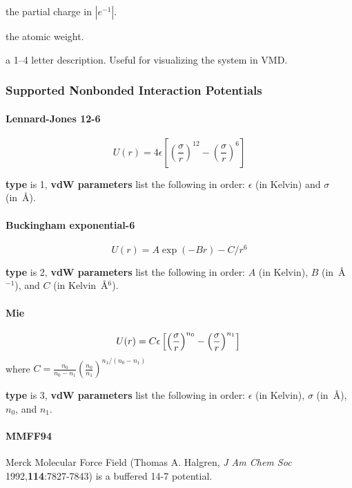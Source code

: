 \documentclass[12pt,letterpaper]{article}
\begin{document}
 the partial charge in $|e^{-1}|$.

 the atomic weight.

 a 1--4 letter description. Useful for
visualizing the system in VMD.

\subsubsection{Supported Nonbonded Interaction Potentials}
\label{vdW}
\paragraph{Lennard-Jones 12-6}

\begin{equation}
U(r) = 4 \epsilon \left[\left(\frac{\sigma}{r}\right)^{12}
-\left(\frac{\sigma}{r}\right)^6 \right]
\end{equation}

{\bf type} is 1, {\bf vdW parameters} list the following in
order: $\epsilon$ (in Kelvin) and $\sigma$ (in~\AA).

\paragraph{Buckingham exponential-6}
\begin{equation}
U(r) = A \exp(-Br) - C/r^6
\end{equation}

{\bf type} is 2, {\bf vdW parameters} list the following in
order: $A$ (in Kelvin), $B$ (in~\AA$^{-1}$), and $C$ (in
Kelvin~\AA$^6$).

\paragraph{Mie}
\begin{equation}
U(r) = C \epsilon \left[\left(\frac{\sigma}{r}\right)^{n_0}
-\left(\frac{\sigma}{r}\right)^{n_1} \right] \\
\end{equation}
where $C = \frac{n_0}{n_0-n_1} \left(\frac{n_0}{n_1}\right)^{n_1/(n_0-n_1)}$

{\bf type} is 3, {\bf vdW parameters} list the following in
order: $\epsilon$ (in Kelvin), $\sigma$ (in~\AA), $n_0$, and
$n_1$.

\paragraph{MMFF94}
Merck Molecular Force Field (Thomas A. Halgren, \textit{J Am
  Chem Soc} 1992,\textbf{114}:7827-7843) is a buffered 14-7
potential.
\end{document}
